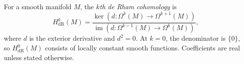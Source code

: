 
For a smooth manifold $M$, the \emph{$k$th de Rham cohomology} is
\[
H_{\mathrm{dR}}^k(M)=
\frac{\ker(d:\Omega^k(M)\to\Omega^{k+1}(M))}
{\operatorname{im}(d:\Omega^{k-1}(M)\to\Omega^k(M))},
\]
where $d$ is the exterior derivative and $d^2=0$. At $k=0$, the denominator is $\{0\}$, so $H^0_{\mathrm{dR}}(M)$ consists of locally constant smooth functions. Coefficients are real unless stated otherwise.
